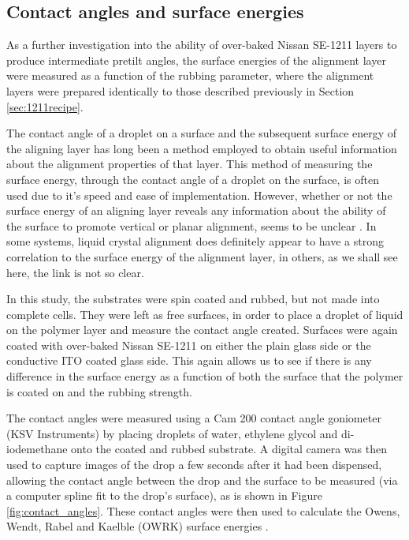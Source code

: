 \subsection{Contact angles and surface energies}
As a further investigation into the ability of over-baked Nissan SE-1211 layers to produce intermediate pretilt angles, the surface energies of the alignment layer were measured as a function of the rubbing parameter, where the alignment layers were prepared identically to those described previously in Section \ref{sec:1211recipe}.

The contact angle of a droplet on a surface and the subsequent surface energy of the aligning layer has long been a method employed to obtain useful information about the alignment properties of that layer. This method of measuring the surface energy, through the contact angle of a droplet on the surface, is often used due to it's speed and ease of implementation. However, whether or not the surface energy of an aligning layer reveals any information about the ability of the surface to promote vertical or planar alignment, seems to be unclear \cite{Cognard1982}. In some systems, liquid crystal alignment does definitely appear to have a strong correlation to the surface energy \cite{Hwang2010} of the alignment layer, in others, as we shall see here, the link is not so clear.

In this study, the substrates were spin coated and rubbed, but not made into complete cells. They were left as free surfaces, in order to place a droplet of liquid on the polymer layer and measure the contact angle created. Surfaces were again coated with over-baked Nissan SE-1211 on either the plain glass side or the conductive ITO coated glass side. This again allows us to see if there is any difference in the surface energy as a function of both the surface that the polymer is coated on and the rubbing strength.

The contact angles were measured using a Cam 200 contact angle goniometer (KSV Instruments) \cite{Cammanual} by placing droplets of water, ethylene glycol and di-iodemethane onto the coated and rubbed substrate. A digital camera was then used to capture images of the drop a few seconds after it had been dispensed, allowing the contact angle between the drop and the surface to be measured (via a computer spline fit to the drop's surface), as is shown in Figure \ref{fig:contact_angles}. These contact angles were then used to calculate the Owens, Wendt, Rabel and Kaelble (OWRK) surface energies \cite{Owens1969}.

